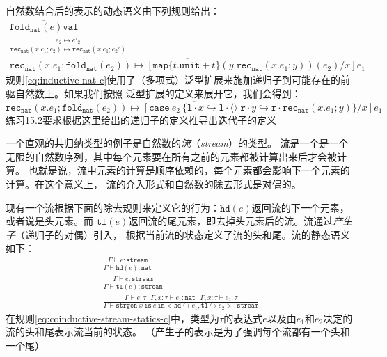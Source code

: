自然数结合后的表示的动态语义由下列规则给出：
\begin{subequations}\label{eq:inductive-nat}
	\begin{gather}
	\overline{\texttt{fold}_\texttt{nat}(e)\texttt{val}} \label{eq:inductive-nat-a}\\
	\frac{e_2\mapsto e'_2}{\texttt{rec}_\texttt{nat}(x.e_1;e_2)\mapsto\texttt{rec}_\texttt{nat}(x.e_1;e_2')} \label{eq:inductive-nat-b}\\
	\overline{\texttt{rec}_\texttt{nat}(x.e_1;\texttt{fold}_\texttt{nat}(e_2)) \mapsto
		[\texttt{map}\{t.\texttt{unit} +t\}(y.\texttt{rec}_\texttt{nat}(x.e_1;y))(e_2)/x]e_1}\label{eq:inductive-nat-c}
	\end{gather}
\end{subequations}
规则\ref{eq:inductive-nat-c}使用了（多项式）泛型扩展来施加递归子到可能存在的前驱自然数上。如果我们按照
泛型扩展的定义来展开它，我们会得到：
$$\overline{\texttt{rec}_\texttt{nat}(x.e_1;\texttt{fold}_\texttt{nat}(e_2)) \mapsto
[\texttt{case}\ e_2\ \{\texttt{l}\cdot x\hookrightarrow\texttt{l}\cdot\langle\rangle|
\texttt{r}\cdot y\hookrightarrow\texttt{r}\cdot\texttt{rec}_\texttt{nat}(x.e_1;y)\}/x]e_1}$$
练习15.2要求根据这里给出的递归子的定义推导出迭代子的定义

一个直观的共归纳类型的例子是自然数的\textit{流}（\textit{stream}）的类型。
流是一个是一个无限的自然数序列，其中每个元素要在所有之前的元素都被计算出来后才会被计算。
也就是说，流中元素的计算是顺序依赖的，每个元素都会影响下一个元素的计算。在这个意义上，
流的介入形式和自然数的除去形式是对偶的。

现有一个流根据下面的除去规则来定义它的行为：$\texttt{hd}(e)$返回流的下一个元素，或者说是头元素。而
$\texttt{tl}(e)$返回流的尾元素，即去掉头元素后的流。流通过\textit{产生子}（递归子的对偶）引入，
根据当前流的状态定义了流的头和尾。流的静态语义如下：
\begin{subequations} \label{eq:coinductive-stream-statics}
	\begin{gather}
	\frac{\Gamma\vdash e:\texttt{stream}}{\Gamma\vdash\texttt{hd}(e):\texttt{nat}} \label{eq:coinductive-stream-statics-a}\\
	\frac{\Gamma\vdash e:\texttt{stream}}{\Gamma\vdash\texttt{tl}(e):\texttt{stream}} \label{eq:coinductive-stream-statics-b}\\
	\frac{\Gamma\vdash e:\tau\ \ \ \Gamma,x:\tau\vdash e_1:\texttt{nat}\ \ \ \Gamma,x:\tau\vdash e_2:\tau}
	{\Gamma\vdash\texttt{strgen}\ x\ \texttt{is}\ e\ \texttt{in} <\texttt{hd}\hookrightarrow e_1,
		\texttt{tl}\hookrightarrow e_2>:\texttt{stream}}\label{eq:coinductive-stream-statics-c}
	\end{gather}
\end{subequations}
在规则\ref{eq:coinductive-stream-statics-c}中，类型为$\tau$的表达式$e$以及由$e_1$和$e_2$决定的流的头和尾表示流当前的状态。
（产生子的表示是为了强调每个流都有一个头和一个尾）

